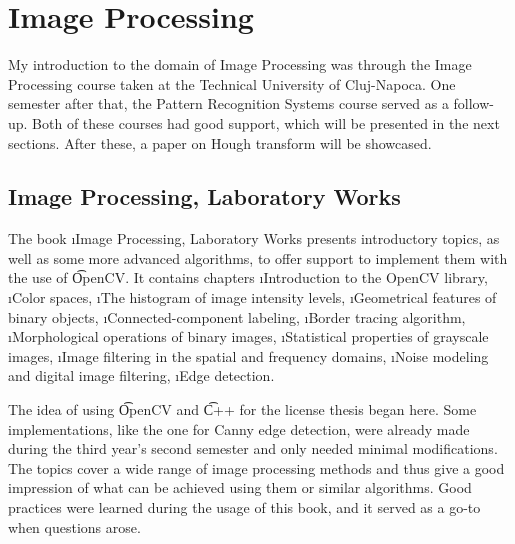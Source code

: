 
\section{Image Processing}

My introduction to the domain of Image Processing was through the Image Processing course taken at the Technical University of Cluj-Napoca. One semester after that, the Pattern Recognition Systems course served as a follow-up. Both of these courses had good support, which will be presented in the next sections. After these, a paper on Hough transform will be showcased. 



\subsection{Image Processing, Laboratory Works}

The book \i{Image Processing, Laboratory Works}\cite{ip_labs} presents introductory topics, as well as some more advanced algorithms, to offer support to implement them with the use of \t{OpenCV}. It contains chapters \i{Introduction to the OpenCV library}, \i{Color spaces}, \i{The histogram of image intensity levels}, \i{Geometrical features of binary objects}, \i{Connected-component labeling}, \i{Border tracing algorithm}, \i{Morphological operations of binary images}, \i{Statistical properties of grayscale images}, \i{Image filtering in the spatial and frequency domains}, \i{Noise modeling and digital image filtering}, \i{Edge detection}.

The idea of using \t{OpenCV} and \t{C++} for the license thesis began here. Some implementations, like the one for Canny edge detection, were already made during the third year's second semester and only needed minimal modifications. The topics cover a wide range of image processing methods and thus give a good impression of what can be achieved using them or similar algorithms. Good practices were learned during the usage of this book, and it served as a go-to when questions arose.



